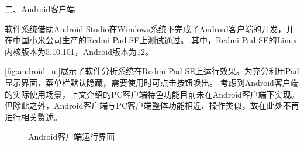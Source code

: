 
二、Android客户端

软件系统借助Android Studio在Windows系统下完成了Android客户端的开发，并在中国小米公司生产的Redmi Pad SE上测试通过。
其中，Redmi Pad SE的Linux内核版本为5.10.101，Android版本为12。


\autoref{fig:android_ui}展示了软件分析系统在Redmi Pad SE上运行效果。为充分利用Pad显示界面，菜单栏默认隐藏，需要使用时可点击按钮唤出。
考虑到Android客户端的实际使用场景，上文介绍的PC客户端特色功能目前未在Android客户端下实现。
但除此之外，Android客户端与PC客户端整体功能相近、操作类似，故在此处不再进行相关赘述。
\begin{figure}[htbp]
    \centering
    \quad
    \caption{\label{fig:android_ui}Android客户端运行界面}
\end{figure}



